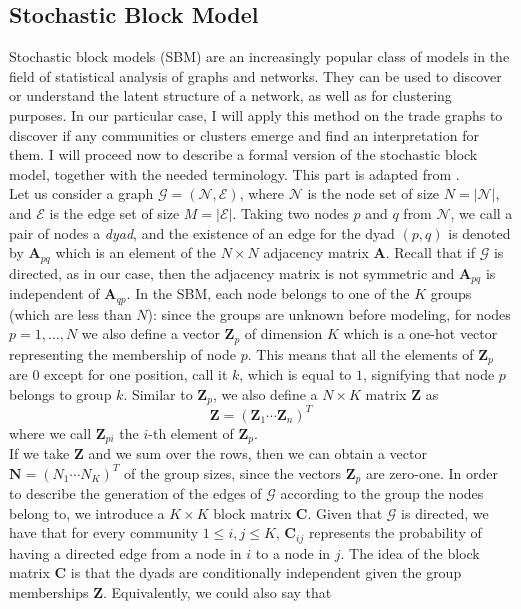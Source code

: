 \subsection{Stochastic Block Model}\label{sec:sbm}
Stochastic block models (SBM) are an increasingly popular class of models in the field of statistical analysis of graphs and networks. They can be used to discover or understand the latent structure of a network, as well as for clustering purposes. In our particular case, I will apply this method on the trade graphs to discover if any communities or clusters emerge and find an interpretation for them.
I will proceed now to describe a formal version of the stochastic block model, together with the needed terminology. This part is adapted from \textcite{lee2019review}.\\
Let us consider a graph $\mathcal{G} = (\mathcal{N},\mathcal{E})$, where $\mathcal{N}$ is the node set of size $N = |\mathcal{N}|$, and $\mathcal{E}$ is the edge set of size $M = |\mathcal{E}|$. Taking two nodes $p$ and $q$ from $\mathcal{N}$, we call a pair of nodes a \textit{dyad}, and the existence of an edge for the dyad $(p,q)$ is denoted by $\mathbf{A}_{pq}$ which is an element of the $N \times N$ adjacency matrix $\mathbf{A}$. Recall that if $\mathcal{G}$ is directed, as in our case, then the adjacency matrix is not symmetric and $\mathbf{A}_{pq}$ is independent of $\mathbf{A}_{qp}$.
In the SBM, each node belongs to one of the $K$ groups (which are less than $N$): since the groups are unknown before modeling, for nodes $p = 1,\ldots,N$ we also define a vector $\mathbf{Z}_p$ of dimension $K$ which is a one-hot vector representing the membership of node $p$. This means that all the elements of $\mathbf{Z}_{p}$ are $0$ except for one position, call it $k$, which is equal to $1$, signifying that node $p$ belongs to group $k$.
Similar to $\mathbf{Z}_{p}$, we also define a $N \times K$ matrix $\mathbf{Z}$ as
\[
    \mathbf{Z} = (\mathbf{Z}_1 \cdots \mathbf{Z}_n)^T
\]
where we call $\mathbf{Z}_{pi}$ the $i$-th element of $\mathbf{Z}_p$.\\
If we take $\mathbf{Z}$ and we sum over the rows, then we can obtain a vector $\mathbf{N} = (N_1 \cdots N_K)^T$ of the group sizes, since the vectors $\mathbf{Z}_{p}$ are zero-one.
In order to describe the generation of the edges of $\mathcal{G}$ according to the group the nodes belong to, we introduce a $K \times K$ block matrix $\mathbf{C}$. Given that $\mathcal{G}$ is directed, we have that for every community $1 \leq i,j \leq K$, $\mathbf{C}_{ij}$ represents the probability of having a directed edge from a node in $i$ to a node in $j$. The idea of the block matrix $\mathbf{C}$ is that the dyads are conditionally independent given the group memberships $\mathbf{Z}$. Equivalently, we could also say that
